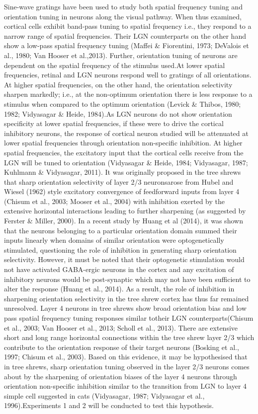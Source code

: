 	Sine-wave gratings have been used to study both spatial frequency tuning and orientation tuning in neurons along the visual pathway. When thus examined, cortical cells exhibit band-pass tuning to spatial frequency i.e., they respond to a narrow range of spatial frequencies. Their LGN counterparts on the other hand show a low-pass spatial frequency tuning (Maffei \& Fiorentini, 1973; DeValois et al., 1980; Van Hooser et al.,2013). Further, orientation tuning of neurons are dependent on the spatial frequency of the stimulus used.At lower spatial frequencies, retinal and LGN neurons respond well to gratings of all orientations. At higher spatial frequencies, on the other hand, the orientation selectivity sharpen markedly; i.e., at the non-optimum orientation there is less response to a stimulus when compared to the optimum orientation (Levick \& Thibos, 1980; 1982; Vidyasagar \& Heide, 1984).As LGN neurons do not show orientation specificity at lower spatial frequencies, if these were to drive the cortical inhibitory neurons, the response of cortical neuron studied will be attenuated at lower spatial frequencies through orientation non-specific inhibition. At higher spatial frequencies, the excitatory input that the cortical cells receive from the LGN will be tuned to orientation (Vidyasagar \& Heide, 1984; Vidyasagar, 1987; Kuhlmann \& Vidyasagar, 2011).
	It was originally proposed in the tree shrews that sharp orientation selectivity of layer 2/3 neuronsarose from Hubel and Wiesel (1962) style excitatory convergence of feedforward inputs from layer 4 (Chisum et al., 2003; Mooser et al., 2004) with inhibition exerted by the extensive horizontal interactions leading to further sharpening (as suggested by Ferster \& Miller, 2000). In a recent study by Huang et al (2014), it was shown that the neurons belonging to a particular orientation domain summed their inputs linearly when domains of similar orientation were optogenetically stimulated, questioning the role of inhibition in generating sharp orientation selectivity. However, it must be noted that their optogenetic stimulation would not have activated GABA-ergic neurons in the cortex and any excitation of inhibitory neurons would be post-synaptic which may not have been sufficient to alter the response (Huang et al., 2014). As a result, the role of inhibition in sharpening orientation selectivity in the tree shrew cortex has thus far remained unresolved.
	Layer 4 neurons in tree shrews show broad orientation bias and low pass spatial frequency tuning responses similar totheir LGN counterparts(Chisum et al., 2003; Van Hooser et al., 2013; Scholl et al., 2013). There are extensive short and long range horizontal connections within the tree shrew layer 2/3 which contribute to the orientation response of their target neurons (Bosking et al., 1997; Chisum et al., 2003). Based on this evidence, it may be hypothesised that in tree shrews, sharp orientation tuning observed in the layer 2/3 neurons comes about by the sharpening of orientation biases of the layer 4 neurons through orientation non-specific inhibition similar to the transition from LGN to layer 4 simple cell suggested in cats (Vidyasagar, 1987; Vidyasagar et al., 1996).Experiments 1 and 2 will be conducted to test this hypothesis.
